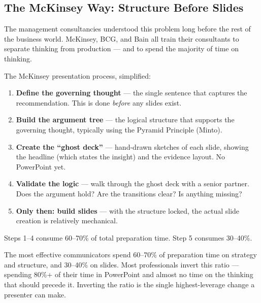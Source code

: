 \subsection{The McKinsey Way: Structure Before Slides}

The management consultancies understood this problem long before the rest of the business world. McKinsey, BCG, and Bain all train their consultants to separate thinking from production --- and to spend the majority of time on thinking.

The McKinsey presentation process, simplified:

\begin{enumerate}
  \item \textbf{Define the governing thought} --- the single sentence that captures the recommendation. This is done \emph{before} any slides exist.
  \item \textbf{Build the argument tree} --- the logical structure that supports the governing thought, typically using the Pyramid Principle (Minto).
  \item \textbf{Create the ``ghost deck''} --- hand-drawn sketches of each slide, showing the headline (which states the insight) and the evidence layout. No PowerPoint yet.
  \item \textbf{Validate the logic} --- walk through the ghost deck with a senior partner. Does the argument hold? Are the transitions clear? Is anything missing?
  \item \textbf{Only then: build slides} --- with the structure locked, the actual slide creation is relatively mechanical.
\end{enumerate}

Steps 1--4 consume 60--70\% of total preparation time. Step 5 consumes 30--40\%.

\begin{insightbox}
The most effective communicators spend 60--70\% of preparation time on strategy and structure, and 30--40\% on slides. Most professionals invert this ratio --- spending 80\%+ of their time in PowerPoint and almost no time on the thinking that should precede it. Inverting the ratio is the single highest-leverage change a presenter can make.
\end{insightbox}

